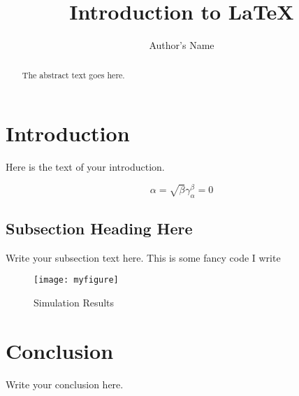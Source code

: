 \documentclass{article}
\begin{document}
\title{Introduction to \LaTeX{}}
\author{Author's Name}

\maketitle

\begin{abstract}
The abstract text goes here.
\end{abstract}

\section{Introduction}
Here is the text of your introduction.

\begin{equation}
\label{simple_equation}
\alpha = \sqrt{ \beta }
\gamma_\alpha^\beta=0
\end{equation}

\subsection{Subsection Heading Here}
Write your subsection text here.
This is some fancy code I write

\begin{figure}
\centering
\texttt{[image: myfigure]}
\caption{Simulation Results}
\label{simulationfigure}
\end{figure}

\section{Conclusion}
Write your conclusion here.
\end{document}
